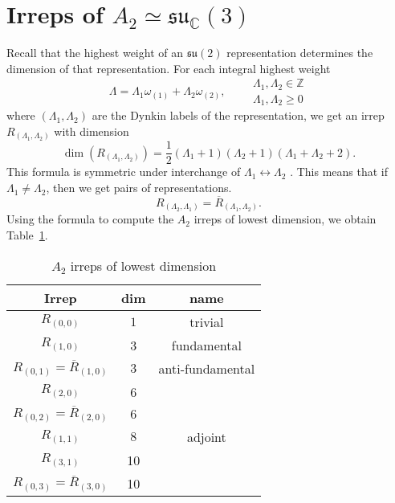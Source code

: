 
\section{Irreps of \texorpdfstring{$A_2 \simeq \mathfrak{su}_{\mathbb{C}}(3)$}{the Complexified Lie Algebra of SU(3)}}%
\label{sec:irreps_of_lie_algebra_of_su_3_}

Recall that the highest weight of an $\mathfrak{su}(2)$ representation determines the dimension of that representation.
For each integral highest weight
\begin{equation}
  \Lambda = \Lambda_1 \omega_{(1)} + \Lambda_2 \omega_{(2)}, \qquad
  \begin{gathered}
    \Lambda_1, \Lambda_2 \in \mathbb{Z} \\
    \Lambda_1, \Lambda_2 \geq 0
  \end{gathered}
\end{equation}
where $(\Lambda_1, \Lambda_2)$ are the Dynkin labels of the representation, we get an irrep $R_{(\Lambda_1, \Lambda_2)}$ with dimension 
\begin{equation}
  \dim(R_{(\Lambda_1, \Lambda_2)}) = \frac{1}{2} (\Lambda_1 + 1) (\Lambda_2 + 1) (\Lambda_1 + \Lambda_2 + 2).
\end{equation}
This formula is symmetric under interchange of $\Lambda_1 \leftrightarrow \Lambda_2$ .
This means that if $\Lambda_1 \neq \Lambda_2$, then we get pairs of representations. 
\begin{equation}
  R_{(\Lambda_2, \Lambda_1)} = \overline{R}_{(\Lambda_1, \Lambda_2)}.
\end{equation}
Using the formula to compute the $A_2$  irreps of lowest dimension, we obtain Table~\ref{tab:23-1}.

\begin{table}[htpb]
  \centering
  \begin{tabular}{ c | c  c }
    Irrep & dim & name \\
    \hline
    $R_{(0,0)}$ & $1$ & trivial \\
    $R_{(1, 0)}$ & 3 & fundamental \\
    $R_{(0, 1)} = \overline{R}_{(1, 0)}$ & $3$ & anti-fundamental \\
    $R_{(2, 0)}$ & 6 &  \\
    $R_{(0, 2)} = \overline{R}_{(2, 0)}$ & $6$ &  \\
    $R_{(1, 1)}$ & $8$ & adjoint \\
    $R_{(3, 1)}$ & 10 & \\
    $R_{(0, 3)} = \overline{R}_{(3, 0)}$ & 10 &  \\
  \end{tabular}
  \caption{$A_2$ irreps of lowest dimension}
  \label{tab:23-1}
\end{table} 


